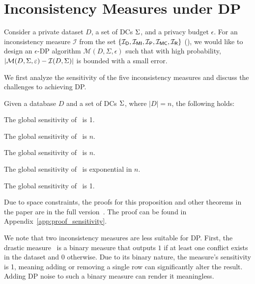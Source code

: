 \section{Inconsistency Measures under DP}\label{sec:problem}

 Consider a private dataset $D$, a set of DCs ${\Sigma}$, and a privacy budget $\epsilon$. For an inconsistency measure $\mathcal{I}$ from the set $\{\mathcal{I_\mathsf{D}},\mathcal{I_{\mathsf{MI}}},\mathcal{I_\mathsf{P}},\mathcal{I_\mathsf{MC}},\mathcal{I_\mathsf{R}}\}$ (), we would like to design an $\epsilon$-DP algorithm $\mathcal{M}(D,\Sigma,\epsilon)$ such that with high probability, $|\mathcal{M}(D, {\Sigma}, \varepsilon) - \mathcal{I}(D, {\Sigma})|$ is bounded with a small error. 


We first analyze the sensitivity of the five inconsistency measures and discuss the challenges to achieving DP.  
\begin{proposition}\label{prop:sensitivity}
Given a database $D$ and a set of DCs ${\Sigma}$, where $|D|=n$, the following holds:
\begin{enumerate*}
    \item The global sensitivity of \drastic\ is 1. 
    \item The global sensitivity of 
    \mininconsistency\ is $n$.       
    \item The global sensitivity of \problematic\ is $n$.
    \item The global sensitivity of \maxconsistency\ is exponential in $n$.
    \item The global sensitivity of \repair\ is 1.
\end{enumerate*}
\end{proposition}
\ifpaper
Due to space constraints, the proofs for this proposition and other theorems in the paper are in the full version~\cite{full_paper}.  \else
The proof can be found in Appendix~\ref{app:proof_sensitivity}.
\fi 


\label{sec:hardness}
We note that two inconsistency measures are less suitable for DP. First, the drastic measure \drastic\ is a binary measure that outputs $1$ if at least one conflict exists in the dataset and $0$ otherwise. Due to its binary nature, the measure's sensitivity is 1, meaning adding or removing a single row can significantly alter the result. Adding DP noise to such a binary measure can render it meaningless.

